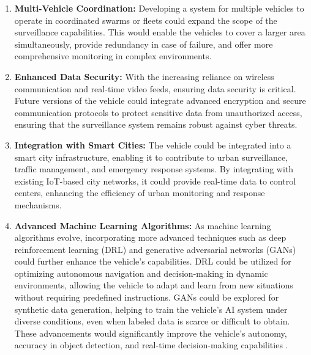 \documentclass[12pt,a4paper]{report}
\begin{document}
\begin{enumerate}
    
\item \textbf{Multi-Vehicle Coordination:} 
Developing a system for multiple vehicles to operate in coordinated swarms or fleets could expand the scope of the surveillance capabilities. This would enable the vehicles to cover a larger area simultaneously, provide redundancy in case of failure, and offer more comprehensive monitoring in complex environments. 

\item \textbf{Enhanced Data Security:} 
With the increasing reliance on wireless communication and real-time video feeds, ensuring data security is critical. Future versions of the vehicle could integrate advanced encryption and secure communication protocols to protect sensitive data from unauthorized access, ensuring that the surveillance system remains robust against cyber threats.

\item \textbf{Integration with Smart Cities:} 
The vehicle could be integrated into a smart city infrastructure, enabling it to contribute to urban surveillance, traffic management, and emergency response systems. By integrating with existing IoT-based city networks, it could provide real-time data to control centers, enhancing the efficiency of urban monitoring and response mechanisms.

\item \textbf{Advanced Machine Learning Algorithms:} 
As machine learning algorithms evolve, incorporating more advanced techniques such as deep reinforcement learning (DRL) and generative adversarial networks (GANs) could further enhance the vehicle's capabilities. DRL could be utilized for optimizing autonomous navigation and decision-making in dynamic environments, allowing the vehicle to adapt and learn from new situations without requiring predefined instructions. GANs could be explored for synthetic data generation, helping to train the vehicle’s AI system under diverse conditions, even when labeled data is scarce or difficult to obtain. These advancements would significantly improve the vehicle’s autonomy, accuracy in object detection, and real-time decision-making capabilities \cite{deepRL, gan}.



\end{enumerate}







	\newpage




 

	
\end{document}
